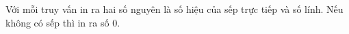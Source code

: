 Với mỗi truy vấn in ra hai số nguyên là số hiệu của sếp trực tiếp và số lính. Nếu không có sếp thì in ra số 0.
